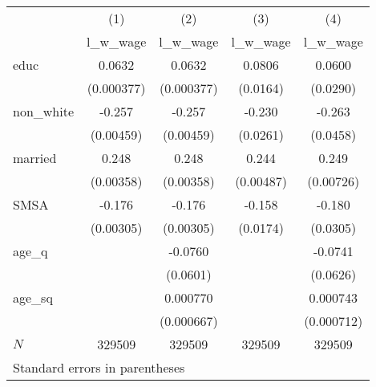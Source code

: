 \begin{tabular}{l*{4}{c}}
\hline\hline
            &\multicolumn{1}{c}{(1)}&\multicolumn{1}{c}{(2)}&\multicolumn{1}{c}{(3)}&\multicolumn{1}{c}{(4)}\\
            &\multicolumn{1}{c}{l\_w\_wage}&\multicolumn{1}{c}{l\_w\_wage}&\multicolumn{1}{c}{l\_w\_wage}&\multicolumn{1}{c}{l\_w\_wage}\\
\hline
educ        &      0.0632&      0.0632&      0.0806&      0.0600\\
            &  (0.000377)&  (0.000377)&    (0.0164)&    (0.0290)\\
[1em]
non\_white   &      -0.257&      -0.257&      -0.230&      -0.263\\
            &   (0.00459)&   (0.00459)&    (0.0261)&    (0.0458)\\
[1em]
married     &       0.248&       0.248&       0.244&       0.249\\
            &   (0.00358)&   (0.00358)&   (0.00487)&   (0.00726)\\
[1em]
SMSA        &      -0.176&      -0.176&      -0.158&      -0.180\\
            &   (0.00305)&   (0.00305)&    (0.0174)&    (0.0305)\\
[1em]
age\_q       &            &     -0.0760&            &     -0.0741\\
            &            &    (0.0601)&            &    (0.0626)\\
[1em]
age\_sq      &            &    0.000770&            &    0.000743\\
            &            &  (0.000667)&            &  (0.000712)\\
\hline
\(N\)       &      329509&      329509&      329509&      329509\\
\hline\hline
\multicolumn{5}{l}{\footnotesize Standard errors in parentheses}\\
\end{tabular}
